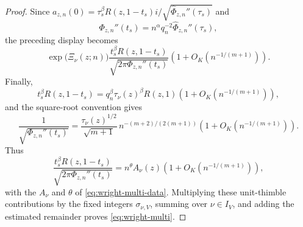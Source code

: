 \documentclass[10pt,a4paper]{amsart}
\begin{document}
\begin{proof}
Since $a_{z,n}(0)=\tau_s^\beta R(z,1-t_s)i/\sqrt{\widehat\Phi_{z,n}''(\tau_s)}$ and
$$\Phi_{z,n}''(t_s)=n^\alpha q_n^{-2}\widehat\Phi_{z,n}''(\tau_s),$$
the preceding display becomes
$$\exp\!\bigl(\Xi_\nu(z;n)\bigr)
\frac{t_s^\beta R(z,1-t_s)}{\sqrt{2\pi\Phi_{z,n}''(t_s)}}
\left(1+O_K\!\left(n^{-1/(m+1)}\right)\right).$$
Finally,
$$t_s^\beta R(z,1-t_s)=q_n^\beta\tau_\nu(z)^\beta R(z,1)
\left(1+O_K\!\left(n^{-1/(m+1)}\right)\right),$$
and the square-root convention gives
$$\frac{1}{\sqrt{\Phi_{z,n}''(t_s)}}=
\frac{\tau_\nu(z)^{1/2}}{\sqrt{m+1}}\,n^{-(m+2)/(2(m+1))}
\left(1+O_K\!\left(n^{-1/(m+1)}\right)\right).$$
Thus
$$\frac{t_s^\beta R(z,1-t_s)}{\sqrt{2\pi\Phi_{z,n}''(t_s)}}
=n^\theta A_\nu(z)\left(1+O_K\!\left(n^{-1/(m+1)}\right)\right),$$
with the $A_\nu$ and $\theta$ of \eqref{eq:wright-multi-data}. Multiplying these unit-thimble contributions by the fixed integers $\sigma_{\nu,V}$, summing over $\nu\in I_V$, and adding the estimated remainder proves \eqref{eq:wright-multi}.
\end{proof}
\end{document}
